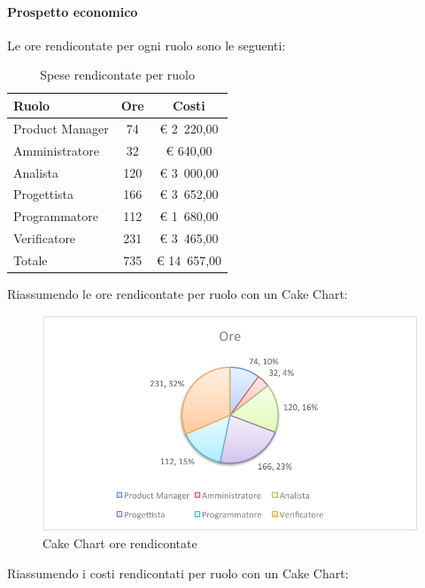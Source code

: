 			\paragraph{Prospetto economico}
				Le ore rendicontate per ogni ruolo sono le seguenti:
				\begin{table}[H]
					\begin{center}
						\begin{tabular}{| l | c | c |}
							\hline
							Ruolo 			& Ore 		& Costi  \\ \hline
							
							Product Manager	& 74 			& \euro{} 2~220,00 	\\
							Amministratore 		& 32 			& \euro{} 640,00 	\\
							Analista	 		& 120 		& \euro{} 3~000,00 	\\
							Progettista 		& 166 		& \euro{} 3~652,00  	\\
							Programmatore		& 112 		& \euro{} 1~680,00 	\\
							Verificatore		& 231 		& \euro{} 3~465,00 	\\ \hline \hline
							
							Totale	 		& 735 		& \euro{} 14~657,00 	\\ \hline
						\end{tabular}
					\end{center}
					\caption{Spese rendicontate per ruolo}
				\end{table}
				Riassumendo le ore rendicontate per ruolo con un Cake Chart:
				\begin{figure}[H]\centering
					\includegraphics[width=\textwidth]{PianoDiProgetto/Pics/ChartTotOreRendic.pdf}
					\caption{Cake Chart ore rendicontate}
				\end{figure}
				Riassumendo i costi rendicontati per ruolo con un Cake Chart:
